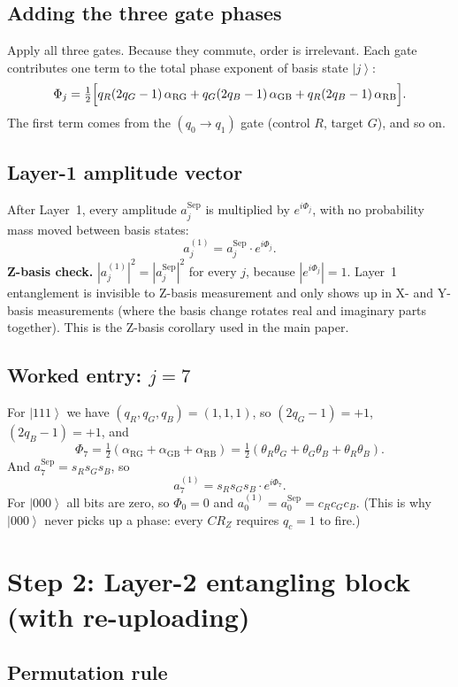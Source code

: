 \documentclass[11pt]{article}
\newcommand{\ket}[1]{\left| #1 \right\rangle}
\begin{document}
\subsection{Adding the three gate phases}

Apply all three gates. Because they commute, order is irrelevant. Each gate contributes one term to the total phase exponent of basis state $\ket{j}$:
\[
\Phi_j = \tfrac{1}{2}\Bigl[ q_R (2 q_G - 1)\, \alpha_\text{RG} + q_G (2 q_B - 1)\, \alpha_\text{GB} + q_R (2 q_B - 1)\, \alpha_\text{RB} \Bigr].
\]
The first term comes from the $(q_0 \to q_1)$ gate (control $R$, target $G$), and so on.

\subsection{Layer-1 amplitude vector}

After Layer~1, every amplitude $a_j^\text{Sep}$ is multiplied by $e^{i\Phi_j}$, with no probability mass moved between basis states:
\[
\boxed{\,a^{(1)}_j = a^\text{Sep}_j \cdot e^{i\Phi_j}.\,}
\]
\textbf{Z-basis check.} $|a^{(1)}_j|^2 = |a^\text{Sep}_j|^2$ for every $j$, because $|e^{i\Phi_j}| = 1$. Layer~1 entanglement is invisible to Z-basis measurement and only shows up in X- and Y-basis measurements (where the basis change rotates real and imaginary parts together). This is the Z-basis corollary used in the main paper.

\subsection{Worked entry: $j = 7$}

For $\ket{111}$ we have $(q_R, q_G, q_B) = (1, 1, 1)$, so $(2 q_G - 1) = +1$, $(2 q_B - 1) = +1$, and
\[
\Phi_7 = \tfrac{1}{2}(\alpha_\text{RG} + \alpha_\text{GB} + \alpha_\text{RB}) = \tfrac{1}{2}(\theta_R \theta_G + \theta_G \theta_B + \theta_R \theta_B).
\]
And $a^\text{Sep}_7 = s_R s_G s_B$, so
\[
a^{(1)}_7 = s_R s_G s_B \cdot e^{i \Phi_7}.
\]
For $\ket{000}$ all bits are zero, so $\Phi_0 = 0$ and $a^{(1)}_0 = a^\text{Sep}_0 = c_R c_G c_B$. (This is why $\ket{000}$ never picks up a phase: every $CR_Z$ requires $q_c = 1$ to fire.)

\section{Step 2: Layer-2 entangling block (with re-uploading)}

\subsection{Permutation rule}
\end{document}
